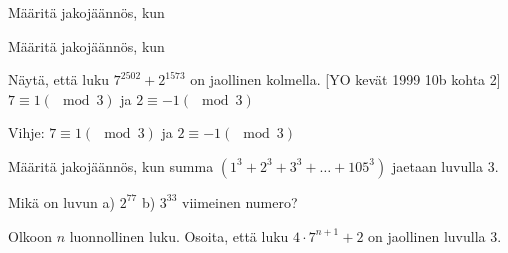 \begin{tehtavasivu}

\begin{tehtava}
  Määritä jakojäännös, kun
  \begin{alakohdat}
  \end{alakohdat}
  \begin{vastaus}
  \begin{alakohdat}
  \end{alakohdat}
  \end{vastaus}
\end{tehtava}


\begin{tehtava}
  Määritä jakojäännös, kun
  \begin{alakohdat}
  \end{alakohdat}
  \begin{vastaus}
  \begin{alakohdat}
  \end{alakohdat}
  \end{vastaus}
\end{tehtava}

\begin{tehtava}
  Näytä, että luku $7^{2502} + 2^{1573}$ on jaollinen kolmella. [YO kevät 1999 10b kohta 2]
  $7 \equiv 1 (\mod{3})$ ja $2 \equiv -1 (\mod{3})$
  \begin{vastaus}
  Vihje: $7 \equiv 1 (\mod{3})$ ja $2 \equiv -1 (\mod{3})$
  \end{vastaus}
\end{tehtava}

\begin{tehtava}
  Määritä jakojäännös, kun summa $(1^3 + 2^3 + 3^3 + \ldots + 105^3)$ jaetaan luvulla $3$.
\end{tehtava}

\begin{tehtava}
  Mikä on luvun a) $2^{77}$ b) $3^{33}$ viimeinen numero?
\end{tehtava}

\begin{tehtava}
  Olkoon $n$ luonnollinen luku. Osoita, että luku $4\cdot 7^{n+1}+2$ on jaollinen luvulla $3$.
\end{tehtava}


\end{tehtavasivu}
